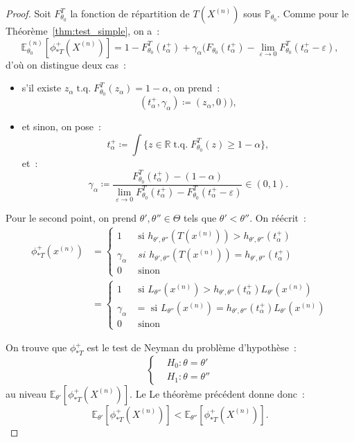 \documentclass{report}
\DeclareMathOperator{\tq}{\text{ t.q. }}
\renewcommand{\P}{\mathbb P}
\newcommand{\E}{\mathbb E}
\newcommand{\R}{\mathbb R}
\newcommand{\n}{{(n)}}
\newcommand{\Xn}{{X^\n}}
\theoremstyle{definition}
\theoremstyle{remark}
\begin{document}
		\begin{proof} Soit $F_{\theta_0}^T$ la fonction de répartition de $T(X^\n)$ sous $\P_{\theta_0}$. Comme pour le Théorème~\ref{thm:test_simple}, on a~:
		\[\E_{\theta_0}^\n[\phi_{*T}^+(X^\n)] =
			1 - F_{\theta_0}^T(t_\alpha^+) + \gamma_\alpha(F_{\theta_0}(t_\alpha^+)-\lim_{\varepsilon \to 0}F_{\theta_0}^T(t_\alpha^+ - \varepsilon),\]
		d'où on distingue deux cas~:
		\begin{itemize}
			\item s'il existe $z_\alpha \tq F_{\theta_0}^T(z_\alpha) = 1 - \alpha$, on prend~:
			\[(t_\alpha^+, \gamma_\alpha) \coloneqq (z_\alpha, 0)),\]
			\item et sinon, on pose~:
			\[t_\alpha^+ \coloneqq \int\{z \in \R \tq F_{\theta_0}^T(z) \geq 1-\alpha\},\]
			et~:
			\[\gamma_\alpha \coloneqq \frac {F_{\theta_0}^T(t_\alpha^+)
				- (1-\alpha)}{\lim_{\varepsilon \to 0}F_{\theta_0}^T(t_\alpha^+) - F_{\theta_0}^T(t_\alpha^+ - \varepsilon)} \in (0, 1).\]
		\end{itemize}

		Pour le second point, on prend $\theta', \theta'' \in \Theta$ tels que $\theta' < \theta''$. On réécrit~:
		\begin{align*}
			\phi_{*T}^+(x^\n) &=
			\begin{cases}
				1 &\text{ si } h_{\theta',\theta''}(T(x^\n)) > h_{\theta',\theta''}(t_\alpha^+) \\
				\gamma_\alpha &\textit{ si } h_{\theta', \theta''}(T(x^\n)) = h_{\theta',\theta''}(t_\alpha^+) \\
				0 &\text{ sinon}
			\end{cases} \\
			&=
			\begin{cases}
				1 &\text{ si } L_{\theta''}(x^\n) > h_{\theta',\theta''}(t_\alpha^+)L_{\theta'}(x^\n) \\
				\gamma_\alpha &= \text{ si } L_{\theta''}(x^\n) = h_{\theta',\theta''}(t_\alpha^+)L_{\theta'}(x^\n) \\
				0 &\text{ sinon}
			\end{cases}
		\end{align*}

		On trouve que $\phi_{*T}^+$ est le test de Neyman du problème d'hypothèse~:
		\[\begin{cases}
			&H_0 : \theta = \theta' \\
			&H_1 : \theta = \theta''
		\end{cases}\]
		au niveau $\E_{\theta'}[\phi_{*T}^+(\Xn)]$. Le Le théorème précédent donne donc~:
		\[\E_{\theta'}[\phi_{*T}^+(\Xn)] < \E_{\theta''}[\phi_{*T}^+(\Xn)].\]


\end{proof}
\end{document}
